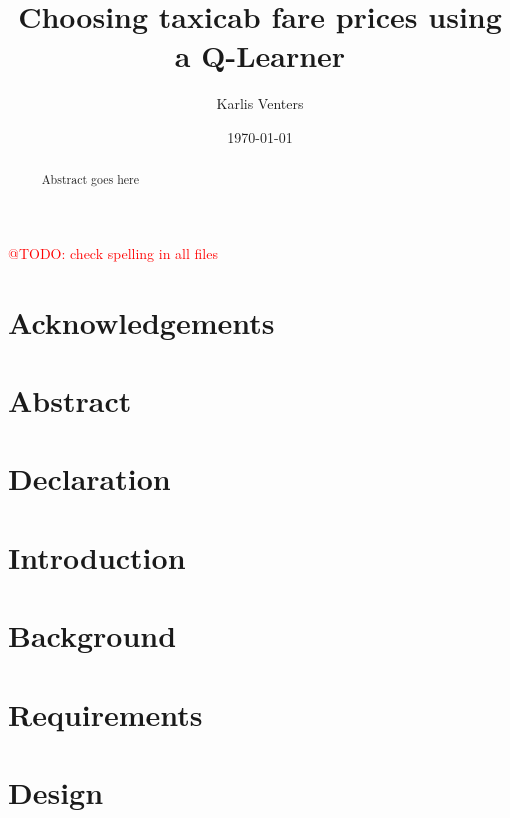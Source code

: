 \documentclass{csfourzero}
\title{Choosing taxicab fare prices using a Q-Learner}
\author{Karlis Venters}
\date{\today}
\makeatletter
\newcommand{\todo}[1]{\textcolor{red}{@TODO: #1}}
\makeatother
\begin{document}
\todo{check spelling in all files}
\maketitle
% 

\newpage
{}
\section*{Acknowledgements}

\newpage
\section*{Abstract}
\begin{abstract}~
Abstract goes here
\end{abstract}

\newpage
\section*{Declaration}


\newpage
{}
\tableofcontents{}

\newpage
{}
\listoffigures

\newpage
{}
\section{Introduction}
\label{sec:intro}



\newpage
\section{Background}
\label{sec:literature}





\newpage
\section{Requirements}
\label{sec:requirements}


\newpage
\section{Design}
\label{sec:design}


\end{document}
